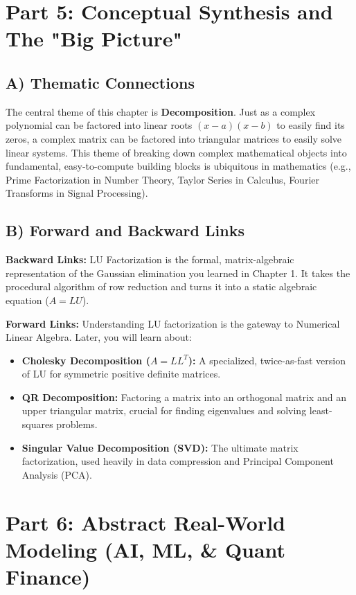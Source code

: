 \documentclass[11pt]{article}
\begin{document}
\newpage
\section{Part 5: Conceptual Synthesis and The "Big Picture"}

\subsection{A) Thematic Connections}
The central theme of this chapter is \textbf{Decomposition}. Just as a complex polynomial can be factored into linear roots $(x-a)(x-b)$ to easily find its zeros, a complex matrix can be factored into triangular matrices to easily solve linear systems. This theme of breaking down complex mathematical objects into fundamental, easy-to-compute building blocks is ubiquitous in mathematics (e.g., Prime Factorization in Number Theory, Taylor Series in Calculus, Fourier Transforms in Signal Processing).

\subsection{B) Forward and Backward Links}
\textbf{Backward Links:} LU Factorization is the formal, matrix-algebraic representation of the Gaussian elimination you learned in Chapter 1. It takes the procedural algorithm of row reduction and turns it into a static algebraic equation ($A=LU$).

\textbf{Forward Links:} Understanding LU factorization is the gateway to Numerical Linear Algebra. Later, you will learn about:
\begin{itemize}
    \item \textbf{Cholesky Decomposition ($A = LL^T$):} A specialized, twice-as-fast version of LU for symmetric positive definite matrices.
    \item \textbf{QR Decomposition:} Factoring a matrix into an orthogonal matrix and an upper triangular matrix, crucial for finding eigenvalues and solving least-squares problems.
    \item \textbf{Singular Value Decomposition (SVD):} The ultimate matrix factorization, used heavily in data compression and Principal Component Analysis (PCA).
\end{itemize}

\newpage
\section{Part 6: Abstract Real-World Modeling (AI, ML, \& Quant Finance)}
\end{document}
